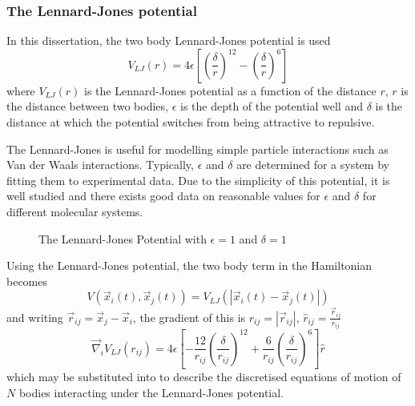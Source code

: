 \subsubsection{The Lennard-Jones potential}
%
In this dissertation, the two body Lennard-Jones potential is used
\begin{equation}
    V_{LJ}(r) = 4\epsilon \left[
        \left( \frac{\delta}{r} \right)^{12}
        - \left( \frac{\delta}{r} \right)^{6}
    \right]
\end  {equation}
where $V_{LJ}(r)$ is the Lennard-Jones potential as
a function of the distance $r$,
$r$ is the distance between two bodies,
$\epsilon$ is the depth of the potential well and
$\delta$ is the distance at which
the potential switches from being attractive to repulsive.

%
The Lennard-Jones is useful for modelling simple particle interactions such as
Van der Waals interactions.
%
Typically, $\epsilon$ and $\delta$ are determined for a system by
fitting them to experimental data.
%
Due to the simplicity of this potential,
it is well studied and there exists good data on
reasonable values for $\epsilon$ and $\delta$ for
different molecular systems.
%
\begin{figure}
    
    \caption{The Lennard-Jones Potential with $\epsilon = 1$ and $\delta = 1$}
    \label{fig:lennard_jones_potential}
\end  {figure}

%
Using the Lennard-Jones potential, the two body term in the Hamiltonian
becomes
\begin{equation}
    V(\vec{x}_i(t), \vec{x}_j(t)) = V_{LJ}(|\vec{x}_i(t) - \vec{x}_j(t)|)
\end  {equation}
and writing $\vec{r}_{ij} = \vec{x}_j - \vec{x}_i$, the gradient of this is
$r_{ij} = |\vec{r}_{ij}|$, $\hat{r}_{ij} = \frac{\vec{r}_{ij}}{r_{ij}}$
\begin{equation}
    \vec{\nabla}_i V_{LJ}(r_{ij}) = 4\epsilon \left[
        - \frac{12}{r_{ij}} \left( \frac{\delta}{r_{ij}} \right)^{12}
        + \frac{6}{r_{ij}} \left( \frac{\delta}{r_{ij}} \right)^{6}
    \right] \hat{r}
\end  {equation}
which may be substituted into  to describe
the discretised equations of motion of $N$ bodies interacting under the
Lennard-Jones potential.

